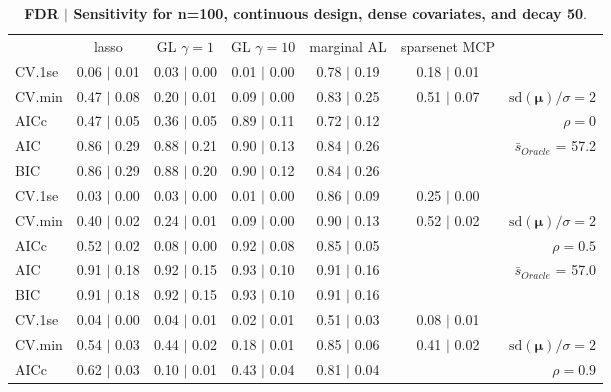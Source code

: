 \begin{table}\vspace{-.5cm}
\caption[l]{ {\it }
{ \bf FDR $\boldsymbol{\mid}$ Sensitivity for n=100, continuous design, dense covariates, and  decay  50}.}
\vspace{-.5cm}
\footnotesize{}
\begin{center}
\begin{tabular}{l*{5}{c}|r}
 & lasso & GL $\gamma=1$ & GL $\gamma=10$ & marginal AL & sparsenet MCP  & \\
 \cline{1-7}
CV.1se & 0.06 $\mid$ 0.01 & 0.03 $\mid$ 0.00 & 0.01 $\mid$ 0.00 & 0.78 $\mid$ 0.19 & 0.18 $\mid$ 0.01 & \\
CV.min & 0.47 $\mid$ 0.08 & 0.20 $\mid$ 0.01 & 0.09 $\mid$ 0.00 & 0.83 $\mid$ 0.25 & 0.51 $\mid$ 0.07 &  $\mathrm{sd}(\mathbf{\mu})/\sigma=2$ \\
AICc & 0.47 $\mid$ 0.05 & 0.36 $\mid$ 0.05 & 0.89 $\mid$ 0.11 & 0.72 $\mid$ 0.12 & & $\rho=0$ \\
AIC & 0.86 $\mid$ 0.29 & 0.88 $\mid$ 0.21 & 0.90 $\mid$ 0.13 & 0.84 $\mid$ 0.26 & &  \multirow{2}{*}{$\bar{s}_{Oracle}$ = 57.2} \\
BIC & 0.86 $\mid$ 0.29 & 0.88 $\mid$ 0.20 & 0.90 $\mid$ 0.12 & 0.84 $\mid$ 0.26 & &  \\
 \hline 
CV.1se & 0.03 $\mid$ 0.00 & 0.03 $\mid$ 0.00 & 0.01 $\mid$ 0.00 & 0.86 $\mid$ 0.09 & 0.25 $\mid$ 0.00 & \\
CV.min & 0.40 $\mid$ 0.02 & 0.24 $\mid$ 0.01 & 0.09 $\mid$ 0.00 & 0.90 $\mid$ 0.13 & 0.52 $\mid$ 0.02 &  $\mathrm{sd}(\mathbf{\mu})/\sigma=2$ \\
AICc & 0.52 $\mid$ 0.02 & 0.08 $\mid$ 0.00 & 0.92 $\mid$ 0.08 & 0.85 $\mid$ 0.05 & & $\rho=0.5$ \\
AIC & 0.91 $\mid$ 0.18 & 0.92 $\mid$ 0.15 & 0.93 $\mid$ 0.10 & 0.91 $\mid$ 0.16 & &  \multirow{2}{*}{$\bar{s}_{Oracle}$ = 57.0} \\
BIC & 0.91 $\mid$ 0.18 & 0.92 $\mid$ 0.15 & 0.93 $\mid$ 0.10 & 0.91 $\mid$ 0.16 & &  \\
 \hline 
CV.1se & 0.04 $\mid$ 0.00 & 0.04 $\mid$ 0.01 & 0.02 $\mid$ 0.01 & 0.51 $\mid$ 0.03 & 0.08 $\mid$ 0.01 & \\
CV.min & 0.54 $\mid$ 0.03 & 0.44 $\mid$ 0.02 & 0.18 $\mid$ 0.01 & 0.85 $\mid$ 0.06 & 0.41 $\mid$ 0.02 &  $\mathrm{sd}(\mathbf{\mu})/\sigma=2$ \\
AICc & 0.62 $\mid$ 0.03 & 0.10 $\mid$ 0.01 & 0.43 $\mid$ 0.04 & 0.81 $\mid$ 0.04 & & $\rho=0.9$ \\

\end{tabular}
\end{center}
\end{table}
